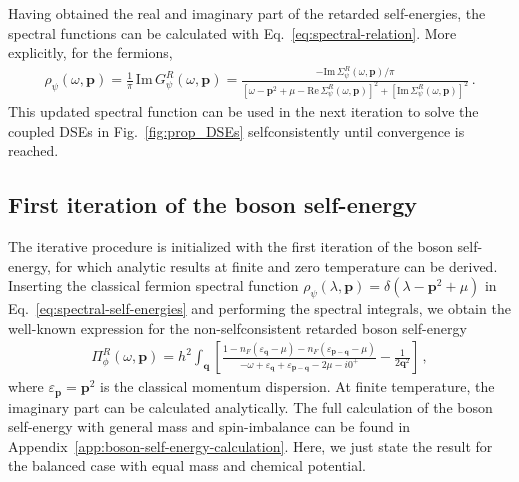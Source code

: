 Having obtained the real and imaginary part of the retarded self-energies, the spectral functions can be calculated with Eq.~\eqref{eq:spectral-relation}. More explicitly, for the fermions,
%
\begin{align}
	\label{eq:spectral-extraction}
	\rho_{\psi}(\omega,\bm{p}) = \frac{1}{\pi}\, \mathrm{Im}\, G^R_{\psi}(\omega,\bm{p}) = \frac{-\mathrm{Im}\,\Sigma^R_{\psi}(\omega,\bm{p})/\pi}{\left[\omega-\bm{p}^2+\mu-\mathrm{Re}\,\Sigma^R_{\psi}(\omega,\bm{p})\right]^2+\left[\mathrm{Im}\, \Sigma^R_{\psi}(\omega,\bm{p})\right]^2} \,.
\end{align}
%
This updated spectral function can be used in the next iteration to solve the coupled DSEs in Fig.~\ref{fig:prop_DSEs} selfconsistently until convergence is reached.


\subsection*{First iteration of the boson self-energy}
\label{sec:first-iteration}

The iterative procedure is initialized with the first iteration of the boson self-energy, for which analytic results at finite and zero temperature can be derived. Inserting the classical fermion spectral function $\rho_{\psi}(\lambda,\bm{p})=\delta(\lambda-\bm{p}^2+\mu)$ in Eq.~\eqref{eq:spectral-self-energies} and performing the spectral integrals, we obtain the well-known expression for the non-selfconsistent retarded boson self-energy
%
\begin{align}
	\label{eq:non-selfconsistent-boson-self-energy}
	\Pi^R_{\phi}(\omega,\bm{p}) = h^2 \int_{\bm{q}}\left[ \frac{1-n_F(\varepsilon_{\bm{q}}-\mu) -n_F(\varepsilon_{\bm{p-q}}-\mu)}{-\omega+\varepsilon_{\bm{q}} + \varepsilon_{\bm{p-q}}-2\mu-i0^+} - \frac{1}{2\bm{q}^2}\right] \,,
\end{align}
%
where $\varepsilon_{\bm{p}}=\bm{p}^2$ is the classical momentum dispersion. At finite temperature, the imaginary part can be calculated analytically. The full calculation of the boson self-energy with general mass and spin-imbalance can be found in Appendix~\ref{app:boson-self-energy-calculation}. Here, we just state the result for the balanced case with equal mass and chemical potential.

